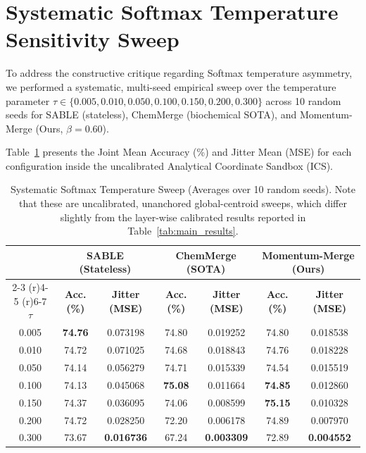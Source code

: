 \documentclass{article}
\theoremstyle{plain}
\theoremstyle{definition}
\theoremstyle{remark}
\begin{document}
\section{Systematic Softmax Temperature Sensitivity Sweep}
\label{app:temperature_sweep}

To address the constructive critique regarding Softmax temperature asymmetry, we performed a systematic, multi-seed empirical sweep over the temperature parameter $\tau \in \{0.005, 0.010, 0.050, 0.100, 0.150, 0.200, 0.300\}$ across 10 random seeds for SABLE (stateless), ChemMerge (biochemical SOTA), and Momentum-Merge (Ours, $\beta = 0.60$). 

Table~\ref{tab:temp_sweep_results} presents the Joint Mean Accuracy (\%) and Jitter Mean (MSE) for each configuration inside the uncalibrated Analytical Coordinate Sandbox (ICS).

\begin{table}[h]
\centering
\caption{Systematic Softmax Temperature Sweep (Averages over 10 random seeds). Note that these are uncalibrated, unanchored global-centroid sweeps, which differ slightly from the layer-wise calibrated results reported in Table~\ref{tab:main_results}.}
\label{tab:temp_sweep_results}
\vskip 0.15in
\begin{tabular}{ccccccc}
\toprule
 & \multicolumn{2}{c}{\textbf{SABLE (Stateless)}} & \multicolumn{2}{c}{\textbf{ChemMerge (SOTA)}} & \multicolumn{2}{c}{\textbf{Momentum-Merge (Ours)}} \\
\cmidrule(r){2-3} \cmidrule(r){4-5} \cmidrule(r){6-7}
$\tau$ & \textbf{Acc. (\%)} & \textbf{Jitter (MSE)} & \textbf{Acc. (\%)} & \textbf{Jitter (MSE)} & \textbf{Acc. (\%)} & \textbf{Jitter (MSE)} \\
\midrule
0.005 & \textbf{74.76} & 0.073198 & 74.80 & 0.019252 & 74.80 & 0.018538 \\
0.010 & 74.72 & 0.071025 & 74.68 & 0.018843 & 74.76 & 0.018228 \\
0.050 & 74.14 & 0.056279 & 74.71 & 0.015339 & 74.54 & 0.015519 \\
0.100 & 74.13 & 0.045068 & \textbf{75.08} & 0.011664 & \textbf{74.85} & 0.012860 \\
0.150 & 74.37 & 0.036095 & 74.06 & 0.008599 & \textbf{75.15} & 0.010328 \\
0.200 & 74.72 & 0.028250 & 72.20 & 0.006178 & 74.89 & 0.007970 \\
0.300 & 73.67 & \textbf{0.016736} & 67.24 & \textbf{0.003309} & 72.89 & \textbf{0.004552} \\
\bottomrule
\end{tabular}
\end{table}
\end{document}
